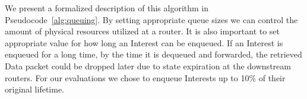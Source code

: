 We present a formalized description of this algorithm in Pseudocode~\ref{alg:queuing}. 
By setting appropriate queue sizes we can control the amount of physical resources utilized at a router.
It is also important to set appropriate value for how long an Interest can be enqueued. 
If an Interest is enqueued for a long time, by the time it is dequeued and forwarded, the retrieved Data packet could be dropped later due to state expiration at the downstream routers. 
For our evaluations we chose to enqueue Interests up to 10\% of their original lifetime.







